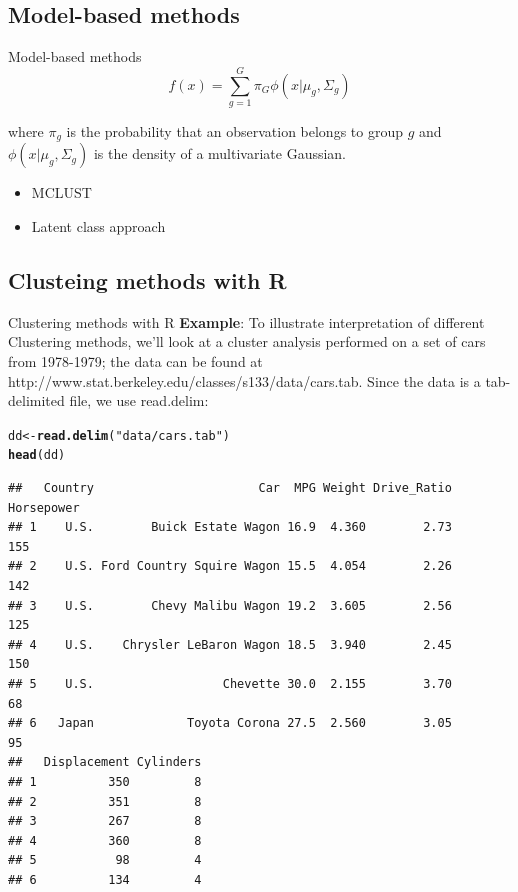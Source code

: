 \documentclass[10pt,xcolor=dvipsnames]{beamer}\usepackage[]{graphicx}\usepackage[]{color}
\makeatletter
\newcommand{\hlstr}[1]{\textcolor[rgb]{0.192,0.494,0.8}{#1}}%
\newcommand{\hlstd}[1]{\textcolor[rgb]{0.345,0.345,0.345}{#1}}%
\newcommand{\hlkwb}[1]{\textcolor[rgb]{0.69,0.353,0.396}{#1}}%
\newcommand{\hlkwd}[1]{\textcolor[rgb]{0.737,0.353,0.396}{\textbf{#1}}}%
\newenvironment{kframe}{%
 \def\at@end@of@kframe{}%
 \ifinner\ifhmode%
  \def\at@end@of@kframe{\end{minipage}}%
  \begin{minipage}{\columnwidth}%
 \fi\fi%
 \def\FrameCommand##1{\hskip\@totalleftmargin \hskip-\fboxsep
 \colorbox{shadecolor}{##1}\hskip-\fboxsep
     \hskip-\linewidth \hskip-\@totalleftmargin \hskip\columnwidth}%
 \MakeFramed {\advance\hsize-\width
   \@totalleftmargin\z@ \linewidth\hsize
   \@setminipage}}%
 {\par\unskip\endMakeFramed%
 \at@end@of@kframe}
\newenvironment{knitrout}{}{} %
\makeatother
\begin{document}
\subsection{Model-based methods}

\begin{frame}{Model-based methods}
$$ f(x) = \sum_{g=1}^G \pi_G \phi(x | \mu_g, \Sigma_g) $$

where $\pi_g$ is the probability that an observation belongs to group $g$ and
$\phi(x | \mu_g, \Sigma_g)$ is the density of a multivariate Gaussian.
\begin{itemize}
 \item MCLUST
 \item Latent class approach
\end{itemize}
\end{frame}


\subsection{Clusteing methods with R}


\begin{frame}{Clustering methods with R}
\textbf{Example}: To illustrate interpretation of different Clustering methods, we'll look at 
a cluster analysis performed on a set of cars from 1978-1979; the data can be found at 
http://www.stat.berkeley.edu/classes/s133/data/cars.tab. Since the data is a tab-delimited file, we use read.delim:

\begin{knitrout}\footnotesize
{}\color{fgcolor}\begin{kframe}
\begin{alltt}
\hlstd{dd} \hlkwb{<-} \hlkwd{read.delim}\hlstd{(}\hlstr{"data/cars.tab"}\hlstd{)}
\hlkwd{head}\hlstd{(dd)}
\end{alltt}
\begin{verbatim}
##   Country                       Car  MPG Weight Drive_Ratio Horsepower
## 1    U.S.        Buick Estate Wagon 16.9  4.360        2.73        155
## 2    U.S. Ford Country Squire Wagon 15.5  4.054        2.26        142
## 3    U.S.        Chevy Malibu Wagon 19.2  3.605        2.56        125
## 4    U.S.    Chrysler LeBaron Wagon 18.5  3.940        2.45        150
## 5    U.S.                  Chevette 30.0  2.155        3.70         68
## 6   Japan             Toyota Corona 27.5  2.560        3.05         95
##   Displacement Cylinders
## 1          350         8
## 2          351         8
## 3          267         8
## 4          360         8
## 5           98         4
## 6          134         4
\end{verbatim}
\end{kframe}
\end{knitrout}

\end{frame}
\end{document}
